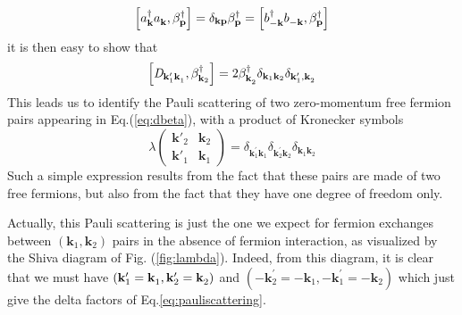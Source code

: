 \documentclass[epj]{svjour}
\newcommand{\vk}{\ensuremath{\mathbf{k}}}
\begin{document}
\begin{equation}  \label{eq:aBeta}
\left[a^{\dagger}_{\mathbf{k} }a^{}_{\mathbf{k} },\beta^{\dagger}_{\mathbf{p}
}\right]  =\delta_{\mathbf{k} \mathbf{p} }\beta^{\dagger}_{\mathbf{p} }=%
\left[b^{\dagger}_{-\mathbf{k} }b^{}_{-\mathbf{k} },\beta^{\dagger}_{\mathbf{%
p} }\right]  
\end{equation}
it is then easy to show that 
\begin{equation}  \label{eq:Dcom}
\left[\mathit{D} _{\mathbf{k} ^{\prime}_1\mathbf{k} ^{}_1},\beta^{\dagger}_{%
\mathbf{k} _2}\right]  =2\beta^{\dagger}_{\mathbf{k} ^{}_2}\delta_{\mathbf{k} _1%
\mathbf{k} _2}\delta_{\mathbf{k} ^{\prime}_1,\mathbf{k} ^{}_2}
\end{equation}
This leads us to identify the Pauli scattering of two zero-momentum free fermion pairs appearing in Eq.(\ref{eq:dbeta}), with a
product of Kronecker symbols 
\begin{equation}  \label{eq:pauliscattering}
\lambda\left(\begin{smallmatrix}\vk'_2&\vk_2\\\vk'_1&\vk_1\end{smallmatrix}%
\right)  =\delta_{\mathbf{k} ^{\prime}_1\mathbf{k} ^{}_1}\delta_{\mathbf{k}
^{\prime}_2\mathbf{k} ^{}_2}\delta_{\mathbf{k} ^{}_1\mathbf{k} ^{}_2}
\end{equation}
Such a simple expression results from the fact that these pairs are made of two free fermions, but also from the fact that they have one degree of freedom only.

Actually, this Pauli scattering is just the one we expect for fermion exchanges between $\left(\mathbf{k} _1,\mathbf{k} _2\right) $ pairs in the absence of fermion interaction,
as visualized by the Shiva diagram of Fig. (\ref{fig:lambda}). Indeed, from this
diagram, it is clear that we must have $\left(\mathbf{k} ^{\prime}_1=\mathbf{%
k} ^{}_1,\mathbf{k} ^{\prime}_2=\mathbf{k} ^{}_2\right) $ and \linebreak $\left(-\mathbf{k}
^{\prime}_2=-\mathbf{k} ^{}_1,-\mathbf{k} ^{\prime}_1=-\mathbf{k} ^{}_2\right) $ which just give the delta
factors of Eq.\eqref{eq:pauliscattering}.
\end{document}
